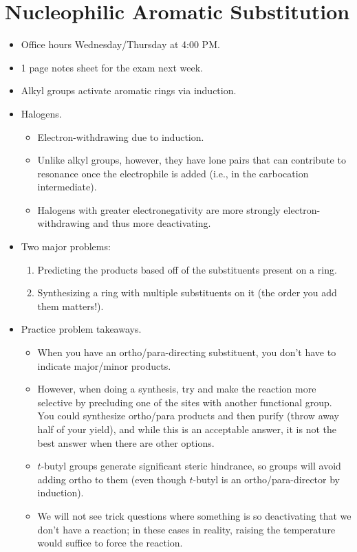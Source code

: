 \documentclass[../notes.tex]{subfiles}
\begin{document}
\section{Nucleophilic Aromatic Substitution}
\begin{itemize}
    \item {}Office hours Wednesday/Thursday at 4:00 PM.
    \item 1 page notes sheet for the exam next week.
    \item Alkyl groups activate aromatic rings via induction.
    \item Halogens.
    \begin{itemize}
        \item Electron-withdrawing due to induction.
        \item Unlike alkyl groups, however, they have lone pairs that can contribute to resonance once the electrophile is added (i.e., in the carbocation intermediate).
        \item Halogens with greater electronegativity are more strongly electron-withdrawing and thus more deactivating.
    \end{itemize}
    \item Two major problems:
    \begin{enumerate}
        \item Predicting the products based off of the substituents present on a ring.
        \item Synthesizing a ring with multiple substituents on it (the order you add them matters!).
    \end{enumerate}
    \item Practice problem takeaways.
    \begin{itemize}
        \item When you have an ortho/para-directing substituent, you don't have to indicate major/minor products.
        \item However, when doing a synthesis, try and make the reaction more selective by precluding one of the sites with another functional group. You could synthesize ortho/para products and then purify (throw away half of your yield), and while this is an acceptable answer, it is not the best answer when there are other options.
        \item $t$-butyl groups generate significant steric hindrance, so groups will avoid adding ortho to them (even though $t$-butyl is an ortho/para-director by induction).
        \item We will not see trick questions where something is so deactivating that we don't have a reaction; in these cases in reality, raising the temperature would suffice to force the reaction.

\end{itemize}
\end{itemize}
\end{document}
